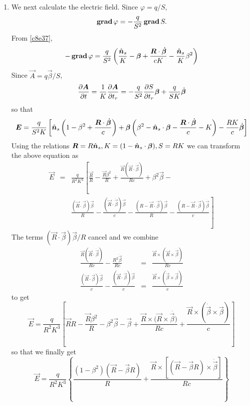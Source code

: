 \begin{enumerate}
\item We next calculate the electric field. Since $\varphi = q/S$,
\[
\operatorname{\textbf{grad}}\varphi = -\frac{q}{S^2}\operatorname{\textbf{grad}} S.
\]
From \eqref{c8e37},
\begin{equation}\label{c8e39}
-\operatorname{\textbf{grad}}\varphi = \frac{q}{S^2}\left(\frac{\hat{\bm{n}}_s}{K} - \bm{\beta} + 
\frac{\bm{R}\cdot\dot{\bm{\beta}}}{cK} - \frac{\hat{\bm{n}}_s}{K}\beta^2\right)
\end{equation}
Since $\vec{A} = q\vec{\beta}/S$,
\[
\frac{\partial{\bm{A}}}{\partial{t}} = \frac{1}{K}\frac{\partial{\bm{A}}}{\partial{t_r}} = 
-\frac{q}{S^2}\frac{\partial{S}}{\partial{t_r}}\bm{\beta} + \frac{q}{SK}\dot{\bm{\beta}}
\]
so that
\begin{equation}\label{c8e40}
\bm{E} = \frac{q}{S^2K}\left[
\hat{\bm{n}}_s\left(1 - \beta^2 + \frac{\bm{R}\cdot\dot{\bm{\beta}}}{c}\right) +
\bm{\beta}\left(\beta^2 - \hat{\bm{n}}_s\cdot\bm{\beta} - 
    \frac{\bm{R}\cdot\dot{\bm{\beta}}}{c} - K\right) - 
\frac{RK}{c}\dot{\bm{\beta}}\right]
\end{equation}
Using the relations $\bm{R} = R\hat{\bm{n}}_s, K = (1 - \hat{\bm{n}}_s\cdot\bm{\beta}), S = RK$
we can transform the above equation as
\begin{eqnarray*}
\vec{E} &=& \frac{q}{R^2K^3}\left[\frac{\vec{R}}{R} - \frac{\vec{R}\beta^2}{R}
 + \frac{\vec{R}(\vec{R}\cdot\dot{\vec{\beta}})}{Rc} 
 + \beta^2\vec{\beta} - \right.\\
 & & \left.\frac{(\vec{R}\cdot\vec{\beta})\vec{\beta}}{R} - 
     \frac{(\vec{R}\cdot\dot{\vec{\beta}})\vec{\beta}}{c} - 
     \frac{(R - \vec{R}\cdot\vec{\beta})\vec{\beta}}{R} - 
     \frac{(R - \vec{R}\cdot\vec{\beta})\dot{\vec{\beta}}}{c}\right]
\end{eqnarray*}
The terms $(\vec{R}\cdot\vec{\beta})\vec{\beta}/R$ cancel and we combine 
\begin{eqnarray*}
\frac{\vec{R}(\vec{R}\cdot\dot{\vec{\beta}})}{Rc} - 
\frac{R^2\dot{\vec{\beta}}}{Rc} &=& 
\frac{\vec{R}\times(\vec{R}\times\dot{\vec{\beta}})}{Rc} \\
\frac{(\vec{R}\cdot\vec{\beta})\dot{\vec{\beta}}}{c} - 
\frac{(\vec{R}\cdot\dot{\vec{\beta}})\vec{\beta}}{c} &=&
\frac{\vec{R}\times(\dot{\vec{\beta}}\times\vec{\beta})}{c}
\end{eqnarray*}
to get
\[
\vec{E} = \frac{q}{R^2K^3}\left[\vec{R}{R} - \frac{\vec{R}\beta^2}{R} -
\beta^2\vec{\beta} - \vec{\beta} + 
\frac{\vec{R}\times(\vec{R}\times\dot{\vec{\beta})}}{Rc} + 
\frac{\vec{R}\times(\dot{\vec{\beta}}\times\vec{\beta})}{c}\right]
\]
so that we finally get
\begin{equation}\label{c8e41}
\vec{E} = \frac{q}{R^2K^3}\left\{\frac{(1-\beta^2)(\vec{R}-\vec{\beta}R)}{R} +
\frac{\vec{R}\times[(\vec{R} - \vec{\beta}R)\times\dot{\vec{\beta}}]}{Rc}
\right\}
\end{equation}


\end{enumerate}
